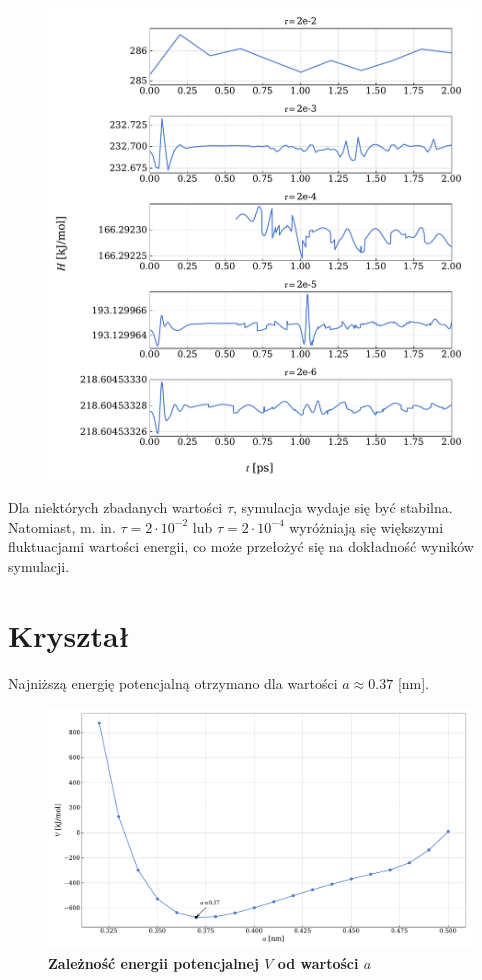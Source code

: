 \documentclass[11pt,a4paper]{article}
\begin{document}
\begin{figure}[ht!]
\begin{multicols}{2}
        \includegraphics[width=\linewidth]{../figures/stability_2.pdf}
    \end{multicols}
\end{figure}


Dla niektórych zbadanych wartości $\tau$, symulacja wydaje się być stabilna. Natomiast, m. in. $\tau=2\cdot10^{-2}$ lub $\tau=2\cdot10^{-4}$ wyróżniają się większymi fluktuacjami wartości energii, co może przełożyć się na dokładność wyników symulacji.

\pagebreak
\section{Kryształ}

Najniższą energię potencjalną otrzymano dla wartości $a\approx0.37$ [nm].

\begin{figure}[ht!]
    \caption{\textbf{Zależność energii potencjalnej $V$ od wartości $a$}}
    \vspace{0.2cm}
    \includegraphics[width=\linewidth]{../figures/plot_V_vs_a.pdf}
\end{figure}
\end{document}
